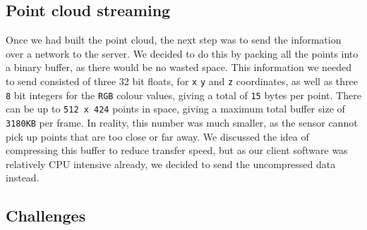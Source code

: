 \documentclass{article}
\begin{document}
\subsection{Point cloud streaming}
Once we had built the point cloud, the next step was to send the information over a network to the server. We decided to do this by packing all the points into a binary buffer, as there would be no wasted space. This information we needed to send consisted of three 32 bit floats, for \texttt{x} \texttt{y} and \texttt{z} coordinates, as well as three \texttt{8} bit integers for the \texttt{RGB} colour values, giving a total of \texttt{15} bytes per point. There can be up to \texttt{512 x 424} points in space, giving a maximum total buffer size of \texttt{3180KB} per frame. In reality, this number was much smaller, as the sensor cannot pick up points that are too close or far away. We discussed the idea of compressing this buffer to reduce transfer speed, but as our client software was relatively CPU intensive already, we decided to send the uncompressed data instead.

\subsection{Challenges}
\end{document}
